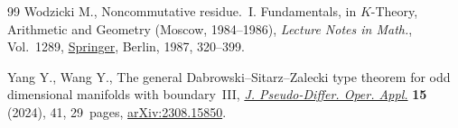 \documentclass[10pt,a4paper]{amsart}
\numberwithin{equation}{section}
\theoremstyle{definition}
\begin{document}
\begin{thebibliography}{99}
Wodzicki M., Noncommutative residue.~{I}. {F}undamentals, in {$K$}-{T}heory,
 {A}rithmetic and {G}eometry ({M}oscow, 1984--1986), \textit{Lecture Notes in
 Math.}, Vol.~1289, \href{https://doi.org/10.1007/BFb0078372}{Springer},
 Berlin, 1987, 320--399.

Yang Y., Wang Y., The general {D}abrowski--{S}itarz--{Z}alecki type theorem for
 odd dimensional manifolds with boundary~{III},
 \href{https://doi.org/10.1007/s11868-024-00604-3}{\textit{J. Pseudo-Differ.
 Oper. Appl.}} \textbf{15} (2024), 41, 29~pages,
 \href{http://arxiv.org/abs/2308.15850}{arXiv:2308.15850}.

\end{thebibliography}
\end{document}
